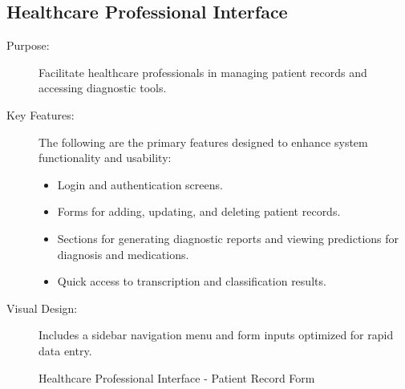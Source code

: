 \documentclass[12pt, titlepage]{article}
\begin{document}
\subsection{Healthcare Professional Interface}
\begin{description}
    \item[Purpose:] Facilitate healthcare professionals in managing patient records and accessing diagnostic tools.
    
    \item[Key Features:] The following are the primary features designed to enhance system functionality and usability:
    \begin{itemize}
        \item Login and authentication screens.
        \item Forms for adding, updating, and deleting patient records.
        \item Sections for generating diagnostic reports and viewing predictions for diagnosis and medications.
        \item Quick access to transcription and classification results.
    \end{itemize}
    
    \item[Visual Design:] Includes a sidebar navigation menu and form inputs optimized for rapid data entry.
\end{description}

\begin{figure}[h!]
    \centering
    \caption{Healthcare Professional Interface - Patient Record Form}
    \label{fig:healthcare-interface-1}
\end{figure}
\end{document}
